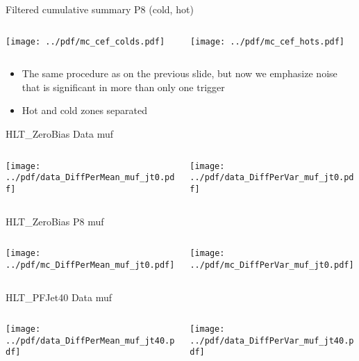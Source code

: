 \documentclass[9pt]{beamer}
\begin{document}
\begin{frame}[t]{Filtered cumulative summary P8 (cold, hot)}
\begin{columns}[T]
  \begin{column}{.5\textwidth}
  \texttt{[image: ../pdf/mc\_cef\_colds.pdf]}
  \end{column}
  \begin{column}{.5\textwidth}
  \texttt{[image: ../pdf/mc\_cef\_hots.pdf]}
  \end{column}
\end{columns}
\begin{itemize}
 \item The same procedure as on the previous slide, but now we emphasize noise that is significant in more than only one trigger
 \item Hot and cold zones separated
\end{itemize}
\end{frame}


\begin{frame}[t]{HLT\_ZeroBias Data muf}
\begin{columns}[T]
  \begin{column}{.5\textwidth}
  \texttt{[image: ../pdf/data\_DiffPerMean\_muf\_jt0.pdf]}
  \end{column}
  \begin{column}{.5\textwidth}
  \texttt{[image: ../pdf/data\_DiffPerVar\_muf\_jt0.pdf]}
  \end{column}
\end{columns}
\end{frame}

\begin{frame}[t]{HLT\_ZeroBias P8 muf}
\begin{columns}[T]
  \begin{column}{.5\textwidth}
  \texttt{[image: ../pdf/mc\_DiffPerMean\_muf\_jt0.pdf]}
  \end{column}
  \begin{column}{.5\textwidth}
  \texttt{[image: ../pdf/mc\_DiffPerVar\_muf\_jt0.pdf]}
  \end{column}
\end{columns}
\end{frame}

\begin{frame}[t]{HLT\_PFJet40 Data muf}
\begin{columns}[T]
  \begin{column}{.5\textwidth}
  \texttt{[image: ../pdf/data\_DiffPerMean\_muf\_jt40.pdf]}
  \end{column}
  \begin{column}{.5\textwidth}
  \texttt{[image: ../pdf/data\_DiffPerVar\_muf\_jt40.pdf]}
  \end{column}
\end{columns}
\end{frame}
\end{document}
